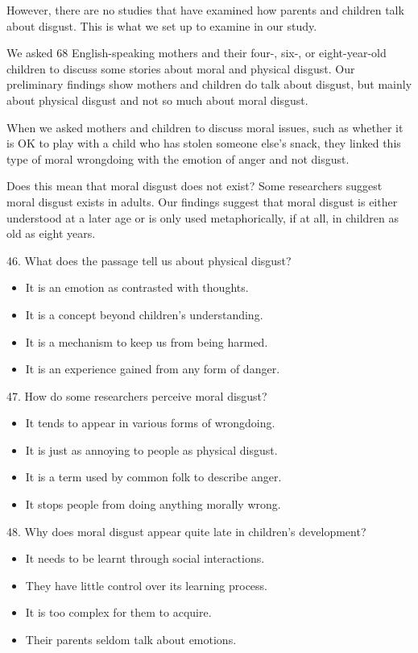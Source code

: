\documentclass[UTF8,11pt]{ctexart}
\begin{document}
However, there are no studies that have examined how parents and children talk about disgust. This is what we set up to examine in our study.


We asked 68 English-speaking mothers and their four-, six-, or eight-year-old children to discuss some stories about moral and physical disgust. Our preliminary findings show mothers and children do talk about disgust, but mainly about physical disgust and not so much about moral disgust.


When we asked mothers and children to discuss moral issues, such as whether it is OK to play with a child who has stolen someone else’s snack, they linked this type of moral wrongdoing with the emotion of anger and not disgust.


Does this mean that moral disgust does not exist? Some researchers suggest moral disgust exists in adults. Our findings suggest that moral disgust is either understood at a later age or is only used metaphorically, if at all, in children as old as eight years.


46. What does the passage tell us about physical disgust?


\begin{itemize}[leftmargin=2em,itemsep=.2em,topsep=.4em]\item[A.] It is an emotion as contrasted with thoughts.
\item[B.] It is a concept beyond children’s understanding.
\item[C.] It is a mechanism to keep us from being harmed.
\item[D.] It is an experience gained from any form of danger.
\end{itemize}

47. How do some researchers perceive moral disgust?


\begin{itemize}[leftmargin=2em,itemsep=.2em,topsep=.4em]\item[A.] It tends to appear in various forms of wrongdoing.
\item[B.] It is just as annoying to people as physical disgust.
\item[C.] It is a term used by common folk to describe anger.
\item[D.] It stops people from doing anything morally wrong.
\end{itemize}

48. Why does moral disgust appear quite late in children’s development?


\begin{itemize}[leftmargin=2em,itemsep=.2em,topsep=.4em]\item[A.] It needs to be learnt through social interactions.
\item[B.] They have little control over its learning process.
\item[C.] It is too complex for them to acquire.
\item[D.] Their parents seldom talk about emotions.
\end{itemize}
\end{document}
